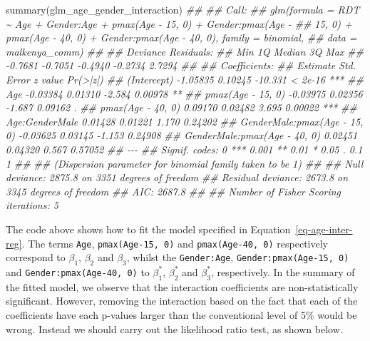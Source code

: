\documentclass[
  letterpaper,
]{krantz}
\newenvironment{Shaded}{\begin{snugshade}}{\end{snugshade}}
\newcommand{\DocumentationTok}[1]{\textcolor[rgb]{0.37,0.37,0.37}{\textit{#1}}}
\newcommand{\FunctionTok}[1]{\textcolor[rgb]{0.28,0.35,0.67}{#1}}
\newcommand{\NormalTok}[1]{\textcolor[rgb]{0.00,0.23,0.31}{#1}}
\begin{document}
\begin{Shaded}
\begin{Highlighting}[]
\FunctionTok{summary}\NormalTok{(glm\_age\_gender\_interaction)}
\DocumentationTok{\#\# }
\DocumentationTok{\#\# Call:}
\DocumentationTok{\#\# glm(formula = RDT \textasciitilde{} Age + Gender:Age + pmax(Age {-} 15, 0) + Gender:pmax(Age {-} }
\DocumentationTok{\#\#     15, 0) + pmax(Age {-} 40, 0) + Gender:pmax(Age {-} 40, 0), family = binomial, }
\DocumentationTok{\#\#     data = malkenya\_comm)}
\DocumentationTok{\#\# }
\DocumentationTok{\#\# Deviance Residuals: }
\DocumentationTok{\#\#     Min       1Q   Median       3Q      Max  }
\DocumentationTok{\#\# {-}0.7681  {-}0.7051  {-}0.4940  {-}0.2734   2.7294  }
\DocumentationTok{\#\# }
\DocumentationTok{\#\# Coefficients:}
\DocumentationTok{\#\#                              Estimate Std. Error z value Pr(\textgreater{}|z|)    }
\DocumentationTok{\#\# (Intercept)                  {-}1.05835    0.10245 {-}10.331  \textless{} 2e{-}16 ***}
\DocumentationTok{\#\# Age                          {-}0.03384    0.01310  {-}2.584  0.00978 ** }
\DocumentationTok{\#\# pmax(Age {-} 15, 0)            {-}0.03975    0.02356  {-}1.687  0.09162 .  }
\DocumentationTok{\#\# pmax(Age {-} 40, 0)             0.09170    0.02482   3.695  0.00022 ***}
\DocumentationTok{\#\# Age:GenderMale                0.01428    0.01221   1.170  0.24202    }
\DocumentationTok{\#\# GenderMale:pmax(Age {-} 15, 0) {-}0.03625    0.03145  {-}1.153  0.24908    }
\DocumentationTok{\#\# GenderMale:pmax(Age {-} 40, 0)  0.02451    0.04320   0.567  0.57052    }
\DocumentationTok{\#\# {-}{-}{-}}
\DocumentationTok{\#\# Signif. codes:  0 \textquotesingle{}***\textquotesingle{} 0.001 \textquotesingle{}**\textquotesingle{} 0.01 \textquotesingle{}*\textquotesingle{} 0.05 \textquotesingle{}.\textquotesingle{} 0.1 \textquotesingle{} \textquotesingle{} 1}
\DocumentationTok{\#\# }
\DocumentationTok{\#\# (Dispersion parameter for binomial family taken to be 1)}
\DocumentationTok{\#\# }
\DocumentationTok{\#\#     Null deviance: 2875.8  on 3351  degrees of freedom}
\DocumentationTok{\#\# Residual deviance: 2673.8  on 3345  degrees of freedom}
\DocumentationTok{\#\# AIC: 2687.8}
\DocumentationTok{\#\# }
\DocumentationTok{\#\# Number of Fisher Scoring iterations: 5}
\end{Highlighting}
\end{Shaded}

The code above shows how to fit the model specified in
Equation~\ref{eq-age-inter-reg}. The terms \texttt{Age},
\texttt{pmax(Age-15,\ 0)} and \texttt{pmax(Age-40,\ 0)} respectively
correspond to \(\beta_{1}\), \(\beta_{2}\) and \(\beta_{3}\), whilst the
\texttt{Gender:Age}, \texttt{Gender:pmax(Age-15,\ 0)} and
\texttt{Gender:pmax(Age-40,\ 0)} to \(\beta_{1}^*\), \(\beta_{2}^*\) and
\(\beta_{3}^*\), respectively. In the summary of the fitted model, we
observe that the interaction coefficients are non-statistically
significant. However, removing the interaction based on the fact that
each of the coefficients have each p-values larger than the conventional
level of 5\% would be wrong. Instead we should carry out the likelihood
ratio test, as shown below.
\end{document}
